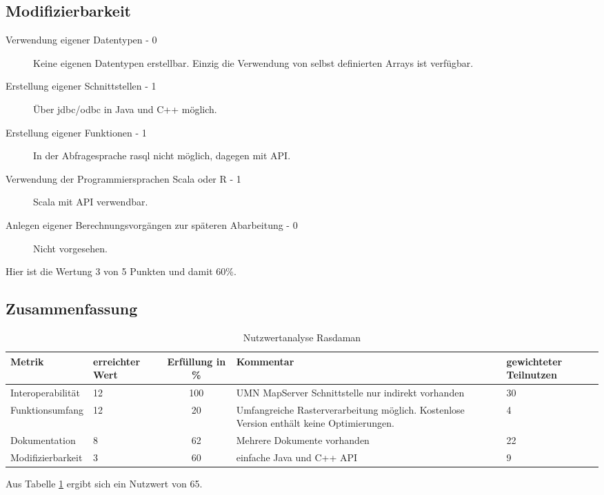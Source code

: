 \subsection{Modifizierbarkeit}
\begin{description}
\item[Verwendung eigener Datentypen - 0] Keine eigenen Datentypen erstellbar. Einzig die Verwendung von selbst definierten Arrays ist verfügbar.
\item[Erstellung eigener Schnittstellen - 1] Über \Gls{jdbc}/\Gls{odbc} in Java und C++ möglich.
\item[Erstellung eigener Funktionen - 1] In der Abfragesprache rasql nicht möglich, dagegen mit API.
\item[Verwendung der Programmiersprachen Scala oder R - 1] Scala mit API verwendbar.
\item[Anlegen eigener Berechnungsvorgängen zur späteren Abarbeitung - 0] Nicht vorgesehen.
\end{description}
Hier ist die Wertung 3 von 5 Punkten und damit 60\%.

\subsection{Zusammenfassung}
\begin{table}[h!]
\centering
\small
\begin{tabular}{l|p{1.8cm}|c|p{3.1cm}|p{1.8cm}}
\textbf{Metrik} & \textbf{erreichter Wert} & \textbf{Erfüllung in \%} & \textbf{Kommentar} & \textbf{gewichteter Teilnutzen} \\ \hline
Interoperabilität & 12 & 100 & UMN MapServer Schnittstelle nur indirekt vorhanden & 30 \\ \hline
Funktionsumfang & 12 & 20 & Umfangreiche Rasterverarbeitung möglich. Kostenlose Version enthält keine Optimierungen. & 4 \\ \hline
Dokumentation & 8 & 62 & Mehrere Dokumente vorhanden & 22 \\ \hline
Modifizierbarkeit & 3 & 60 & einfache Java und C++ API & 9 \\
\end{tabular}
\caption{Nutzwertanalyse Rasdaman}
\label{table:nutzwertanalyse-rasdaman}
\end{table}
Aus Tabelle \ref{table:nutzwertanalyse-rasdaman} ergibt sich ein Nutzwert von 65.



